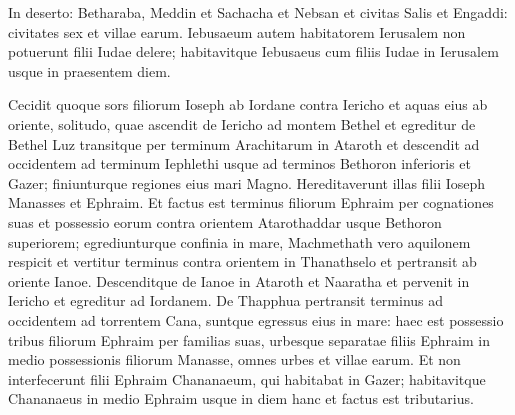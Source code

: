 \begin{biblechapter}
\begin{biblechapter}
\begin{biblechapter}
\begin{biblechapter}
\begin{biblechapter}
\begin{biblechapter}
\begin{biblechapter}
\begin{biblechapter}
\begin{biblechapter}
\begin{biblechapter}
\begin{biblechapter}
\begin{biblechapter}
\begin{biblechapter}
\begin{biblechapter}
\begin{biblechapter}
 \verse In deserto: Betharaba, Meddin et Sachacha 
\verse et Nebsan et civitas Salis et Engaddi: civitates sex et villae earum.
 \verse Iebusaeum autem habitatorem Ierusalem non potuerunt filii Iudae delere; habitavitque Iebusaeus cum filiis Iudae in Ierusalem usque in praesentem diem.
 
\begin{biblechapter}
\verse Cecidit quoque sors filiorum Ioseph ab Iordane contra Iericho et aquas eius ab oriente, solitudo, quae ascendit de Iericho ad montem Bethel 
\verse et egreditur de Bethel Luz transitque per terminum Arachitarum in Ataroth 
\verse et descendit ad occidentem ad terminum Iephlethi usque ad terminos Bethoron inferioris et Gazer; finiunturque regiones eius mari Magno. 
\verse Hereditaverunt illas filii Ioseph Manasses et Ephraim.
 \verse Et factus est terminus filiorum Ephraim per cognationes suas et possessio eorum contra orientem Atarothaddar usque Bethoron superiorem; 
\verse egrediunturque confinia in mare, Machmethath vero aquilonem respicit et vertitur terminus contra orientem in Thanathselo et pertransit ab oriente Ianoe. 
\verse Descenditque de Ianoe in Ataroth et Naaratha et pervenit in Iericho et egreditur ad Iordanem. 
\verse De Thapphua pertransit terminus ad occidentem ad torrentem Cana, suntque egressus eius in mare: haec est possessio tribus filiorum Ephraim per familias suas, 
\verse urbesque separatae filiis Ephraim in medio possessionis filiorum Manasse, omnes urbes et villae earum.
 \verse Et non interfecerunt filii Ephraim Chananaeum, qui habitabat in Gazer; habitavitque Chananaeus in medio Ephraim usque in diem hanc et factus est tributarius.
 

\end{biblechapter}
\end{biblechapter}
\end{biblechapter}
\end{biblechapter}
\end{biblechapter}
\end{biblechapter}
\end{biblechapter}
\end{biblechapter}
\end{biblechapter}
\end{biblechapter}
\end{biblechapter}
\end{biblechapter}
\end{biblechapter}
\end{biblechapter}
\end{biblechapter}
\end{biblechapter}
